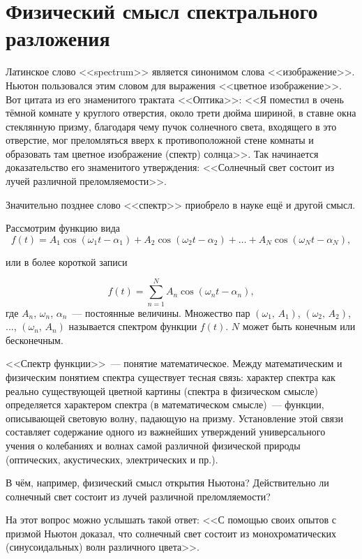 \section{Физический смысл спектрального разложения}

Латинское слово <<spectrum>> является синонимом слова <<изображение>>. Ньютон пользовался этим словом для выражения <<цветное изображение>>. Вот цитата из его знаменитого трактата <<Оптика>>: <<Я поместил в очень тёмной комнате у круглого отверстия, около трети дюйма шириной, в ставне окна стеклянную призму, благодаря чему пучок солнечного света, входящего в это отверстие, мог преломляться вверх к противоположной стене комнаты и образовать там цветное изображение (спектр) солнца>>. Так начинается доказательство его знаменитого утверждения: <<Солнечный свет состоит из лучей различной преломляемости>>.

Значительно позднее слово <<спектр>> приобрело в науке ещё и другой смысл.

Рассмотрим функцию вида
\begin{equation*}
	f(t)=A_1\cos(\omega_1t-\alpha_1)+A_2\cos(\omega_2t-\alpha_2)+\dots +A_N\cos(\omega_Nt-\alpha_N),
\end{equation*}

или в более короткой записи

\begin{equation*}
	f(t)=\sum_{n=1}^N A_n\cos(\omega_nt-\alpha_n),
\end{equation*}
%
где $A_n$, $\omega_n$, $\alpha_n$~--- постоянные величины. Множество пар $(\omega_1,\,A_1)$, $(\omega_2,\,A_2)$, ..., $(\omega_n,\,A_n)$ называется спектром функции $f(t)$. $N$ может быть конечным или бесконечным.

<<Спектр функции>>~--- понятие математическое. Между математическим и физическим понятием спектра существует тесная связь: характер спектра как реально существующей цветной картины (спектра в физическом смысле) определяется характером спектра (в математическом смысле)~--- функции, описывающей световую волну, падающую на призму. Установление этой связи составляет содержание одного из важнейших утверждений универсального учения о колебаниях и волнах самой различной физической природы (оптических, акустических, электрических и пр.).

В чём, например, физический смысл открытия Ньютона? Действительно ли солнечный свет состоит из лучей различной преломляемости?

На этот вопрос можно услышать такой ответ: <<С помощью своих опытов с призмой Ньютон доказал, что солнечный свет состоит из монохроматических (синусоидальных) волн различного цвета>>.

